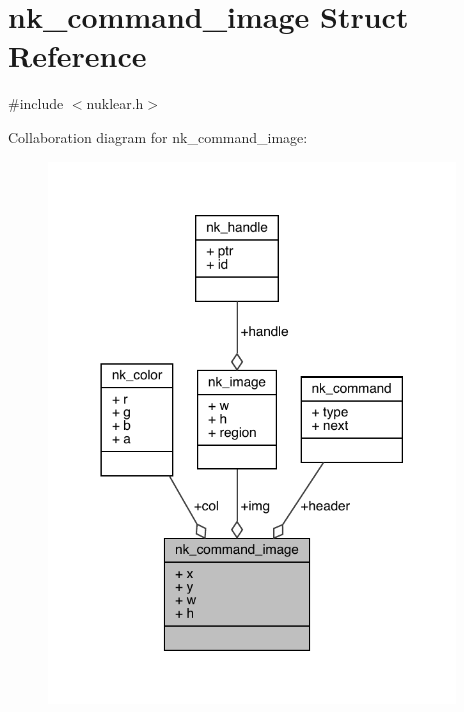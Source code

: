 \hypertarget{structnk__command__image}{}\section{nk\+\_\+command\+\_\+image Struct Reference}
\label{structnk__command__image}


{\ttfamily \#include $<$nuklear.\+h$>$}



Collaboration diagram for nk\+\_\+command\+\_\+image\+:
\nopagebreak
\begin{figure}[H]
\begin{center}
\leavevmode
\includegraphics[width=306pt]{structnk__command__image__coll__graph}
\end{center}
\end{figure}
